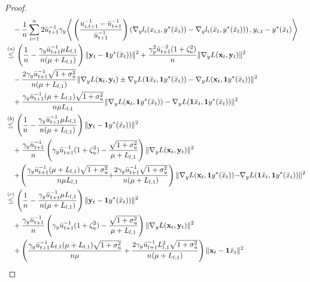 \documentclass{article}
\theoremstyle{plain}
\theoremstyle{definition}
\theoremstyle{remark}
\begin{document}
\begin{proof}
\begin{align}
&\quad -\frac{1}{n}\sum_{i=1}^n 2\bar{u}_{t+1}^{-1} \gamma_y\Bigg\langle \left(\frac{u_{i,t+1}^{-1}-\bar{u}_{t+1}^{-1}}{\bar{u}_{t+1}^{-1}}\right)\left(\nabla_y l_i(x_{i,t}, y^*(\bar{x}_t))-\nabla_y l_i(\bar{x}_{t}, y^*(\bar{x}_t))\right), y_{i,t}-y^*(\bar{x}_t)\Bigg\rangle \nonumber\\
&\overset{(a)}{\leq} \left( \frac{1}{n} - \frac{\gamma_y\bar{u}^{-1}_{t+1} \mu L_{l,1}}{n(\mu + L_{l,1})} \right) \|\mathbf{y}_{t} - \mathbf{1}y^*(\bar{x}_t))\|^2+ \frac{\gamma_y^2\bar{u}^{-2}_{t+1}(1+\zeta_u^2)}{n}\|\nabla_y L(\mathbf{x}_t, \mathbf{y}_t)\|^2 \nonumber\\
&\quad- \frac{2\gamma_y\bar{u}_{t+1}^{-1}\sqrt{1+\sigma_u^2}}{n(\mu + L_{l,1})} \|\nabla_y L(\mathbf{x}_t, \mathbf{y}_t)\pm\nabla_yL(\mathbf{1}\bar{x}_t, \mathbf{1}{y}^*(\bar{x}_t))-\nabla_y L(\mathbf{x}_t, \mathbf{1}{y}^*(\bar{x}_t))\|^2 \nonumber \\
&\quad+ \frac{\gamma_y\bar{u}_{t+1}^{-1}(\mu+L_{l,1})\sqrt{1+\sigma_u^2}}{n\mu L_{l,1}}\|\nabla_y L(\mathbf{x}_t, \mathbf{1}{y}^*(\bar{x}_t))-\nabla_yL(\mathbf{1}\bar{x}_t, \mathbf{1}{y}^*(\bar{x}_t))\|^2 \nonumber \\
&\overset{(b)}{\leq} \left( \frac{1}{n} - \frac{\gamma_y\bar{u}^{-1}_{t+1} \mu L_{l,1}}{n(\mu + L_{l,1})} \right) \|\mathbf{y}_{t} - \mathbf{1}y^*(\bar{x}_t))\|^2\notag\\
&\quad+ \frac{\gamma_y\bar{u}^{-1}_{t+1}}{n} \left( \gamma_y\bar{u}^{-1}_{t+1}(1+\zeta_u^2) - \frac{\sqrt{1+\sigma_u^2}}{\mu + L_{l,1}} \right) \|\nabla_y L(\mathbf{x}_t, \mathbf{y}_t)\|^2\nonumber\\
&\quad+\! \left(\frac{\gamma_y\bar{u}_{t+1}^{-1}(\mu+L_{l,1})\sqrt{1+\sigma_u^2}}{n\mu L_{l,1}}\!\!+\!\!\frac{2\gamma_y\bar{u}_{t+1}^{-1}\sqrt{1+\sigma_u^2}}{n(\mu + L_{l,1})}\right)\|\nabla_y L(\mathbf{x}_t, \mathbf{1}{y}^*(\bar{x}_t))\!-\!\!\nabla_yL(\mathbf{1}\bar{x}_t, \mathbf{1}{y}^*(\bar{x}_t))\|^2 \nonumber \\
&\overset{(c)}{\leq} \left( \frac{1}{n} - \frac{\gamma_y\bar{u}^{-1}_{t+1} \mu L_{l,1}}{n(\mu + L_{l,1})} \right) \|\mathbf{y}_{t} - \mathbf{1}y^*(\bar{x}_t))\|^2\notag\\
&\quad+ \frac{\gamma_y\bar{u}^{-1}_{t+1}}{n} \left( \gamma_y\bar{u}^{-1}_{t+1}(1+\zeta_u^2) - \frac{\sqrt{1+\sigma_u^2}}{\mu + L_{l,1}} \right) \|\nabla_y L(\mathbf{x}_t, \mathbf{y}_t)\|^2 \nonumber\\
&\quad + \left(\frac{\gamma_y\bar{u}_{t+1}^{-1}L_{l,1}(\mu+L_{l,1})\sqrt{1+\sigma_u^2}}{n\mu }+\frac{2\gamma_y\bar{u}_{t+1}^{-1}L_{l,1}^2\sqrt{1+\sigma_u^2}}{n(\mu + L_{l,1})}\right) \|\mathbf{x}_t-\mathbf{1}\bar{x}_t\|^2 \nonumber \\

\end{align}
\end{proof}
\end{document}
